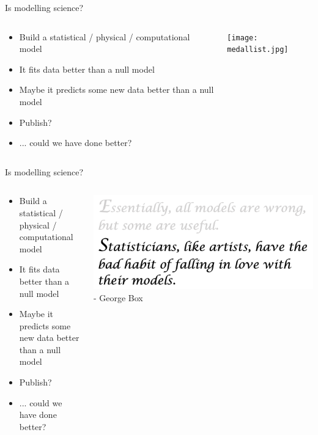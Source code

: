 \documentclass[10pt]{beamer}
\begin{document}
\begin{frame}{Is modelling science?}
  \begin{columns}
    \begin{column}{0.4\textwidth}
  \begin{itemize}
  \item Build a statistical / physical / computational model
  \item It fits data better than a null model
    \item Maybe it predicts some new data better than a null model
    \item Publish?
      \item ... could we have done better?
  \end{itemize}
    \end{column}
    \begin{column}{0.6\textwidth}
      \texttt{[image: medallist.jpg]}
    \end{column}
        \end{columns}
\end{frame}

\begin{frame}{Is modelling science?}
  \begin{columns}
    \begin{column}{0.4\textwidth}
  \begin{itemize}
  \item Build a statistical / physical / computational model
  \item It fits data better than a null model
    \item Maybe it predicts some new data better than a null model
    \item Publish?
      \item ... could we have done better?
  \end{itemize}
    \end{column}
    \begin{column}{0.6\textwidth}
   \includegraphics[width=\textwidth]{boxquote.png}
    - George Box
    \end{column}
        \end{columns}
\end{frame}
\end{document}
